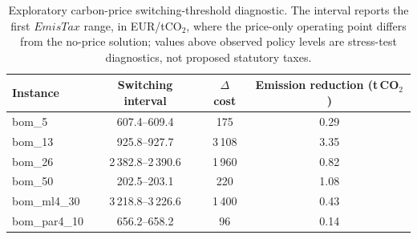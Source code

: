 \begin{table}[!htbp]\centering\scriptsize
\setlength{\tabcolsep}{4pt}
\caption{Exploratory carbon-price switching-threshold diagnostic. The interval reports the first $EmisTax$ range, in EUR/tCO$_2$, where the price-only operating point differs from the no-price solution; values above observed policy levels are stress-test diagnostics, not proposed statutory taxes.}\label{tab:pricethreshold}
\begin{tabular}{lccc}
\toprule
Instance & Switching interval & $\Delta$ cost & Emission reduction (t\,CO$_2$)\\
\midrule
bom\_5 & 607.4--609.4 & 175 & 0.29 \\
bom\_13 & 925.8--927.7 & 3\,108 & 3.35 \\
bom\_26 & 2\,382.8--2\,390.6 & 1\,960 & 0.82 \\
bom\_50 & 202.5--203.1 & 220 & 1.08 \\
bom\_ml4\_30 & 3\,218.8--3\,226.6 & 1\,400 & 0.43 \\
bom\_par4\_10 & 656.2--658.2 & 96 & 0.14 \\
\bottomrule
\end{tabular}
\end{table}
